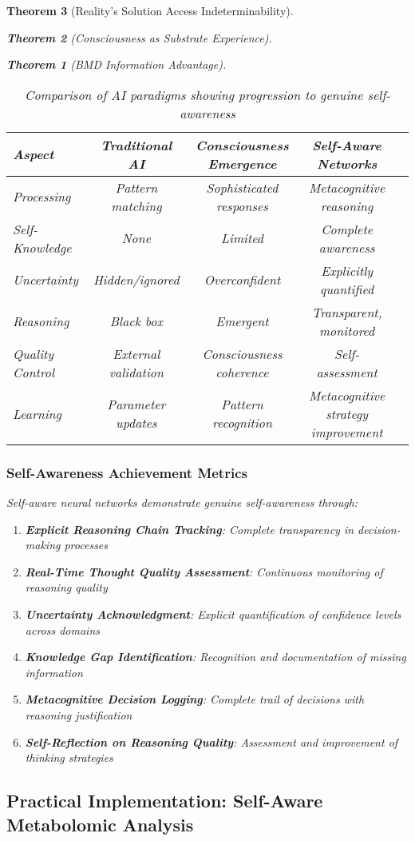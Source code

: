 \documentclass[12pt,a4paper]{article}
\newtheorem{theorem}{Theorem}[section]
\theoremstyle{remark}
\begin{document}
\begin{theorem}[Reality's Solution Access Indeterminability]
\begin{theorem}[Consciousness as Substrate Experience]
\begin{theorem}[BMD Information Advantage]
{\begin{table}[H]
\centering
\begin{tabular}{lcccc}
\toprule
\textbf{Aspect} & \textbf{Traditional AI} & \textbf{Consciousness Emergence} & \textbf{Self-Aware Networks} \\
\midrule
Processing & Pattern matching & Sophisticated responses & Metacognitive reasoning \\
Self-Knowledge & None & Limited & Complete awareness \\
Uncertainty & Hidden/ignored & Overconfident & Explicitly quantified \\
Reasoning & Black box & Emergent & Transparent, monitored \\
Quality Control & External validation & Consciousness coherence & Self-assessment \\
Learning & Parameter updates & Pattern recognition & Metacognitive strategy improvement \\
\bottomrule
\end{tabular}
\caption{Comparison of AI paradigms showing progression to genuine self-awareness}
\end{table}

\subsubsection{Self-Awareness Achievement Metrics}

Self-aware neural networks demonstrate genuine self-awareness through:

\begin{enumerate}
\item \textbf{Explicit Reasoning Chain Tracking}: Complete transparency in decision-making processes
\item \textbf{Real-Time Thought Quality Assessment}: Continuous monitoring of reasoning quality
\item \textbf{Uncertainty Acknowledgment}: Explicit quantification of confidence levels across domains
\item \textbf{Knowledge Gap Identification}: Recognition and documentation of missing information
\item \textbf{Metacognitive Decision Logging}: Complete trail of decisions with reasoning justification
\item \textbf{Self-Reflection on Reasoning Quality}: Assessment and improvement of thinking strategies
\end{enumerate}

\subsection{Practical Implementation: Self-Aware Metabolomic Analysis}

}
\end{theorem}
\end{theorem}
\end{theorem}
\end{document}
